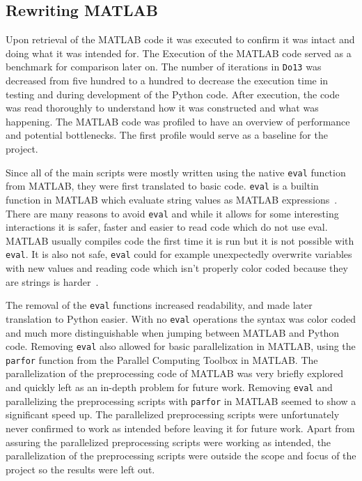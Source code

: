 \documentclass[12pt, a4paper]{article}
\begin{document}
\subsection{Rewriting MATLAB}

Upon retrieval of the MATLAB code it was executed to confirm it was intact and doing what it was intended for. 
The Execution of the MATLAB code served as a benchmark for comparison later on.
The number of iterations in \texttt{Do13} was decreased from five hundred to a hundred to decrease the execution time in testing and during development of the Python code.
After execution, the code was read thoroughly to understand how it was constructed and what was happening.
The MATLAB code was profiled to have an overview of performance and potential bottlenecks.
The first profile would serve as a baseline for the project.

Since all of the main scripts were mostly written using the native \texttt{eval} function from MATLAB, they were first translated to basic code.
\texttt{eval} is a builtin function in MATLAB which evaluate string values as MATLAB expressions~\cite{mat:eval}.
There are many reasons to avoid \texttt{eval} and while it allows for some interesting interactions it is safer, faster and easier to read code which do not use eval.
MATLAB usually compiles code the first time it is run but it is not possible with \texttt{eval}.
It is also not safe, \texttt{eval} could for example unexpectedly overwrite variables with new values and reading code which isn't properly color coded because they are strings is harder~\cite{matEval}.

The removal of the \texttt{eval} functions increased readability, and made later translation to Python easier. With no \texttt{eval} operations the syntax was color coded and much more distinguishable when jumping between MATLAB and Python code.
Removing \texttt{eval} also allowed for basic parallelization in MATLAB, using the \texttt{parfor} function from the Parallel Computing Toolbox in MATLAB.
The parallelization of the preprocessing code of MATLAB was very briefly explored and quickly left as an in-depth problem for future work.
Removing \texttt{eval} and parallelizing the preprocessing scripts with \texttt{parfor} in MATLAB seemed to show a significant speed up.
The parallelized preprocessing scripts were unfortunately never confirmed to work as intended before leaving it for future work.
Apart from assuring the parallelized preprocessing scripts were working as intended, the parallelization of the preprocessing scripts were outside the scope and focus of the project so the results were left out.
\end{document}

